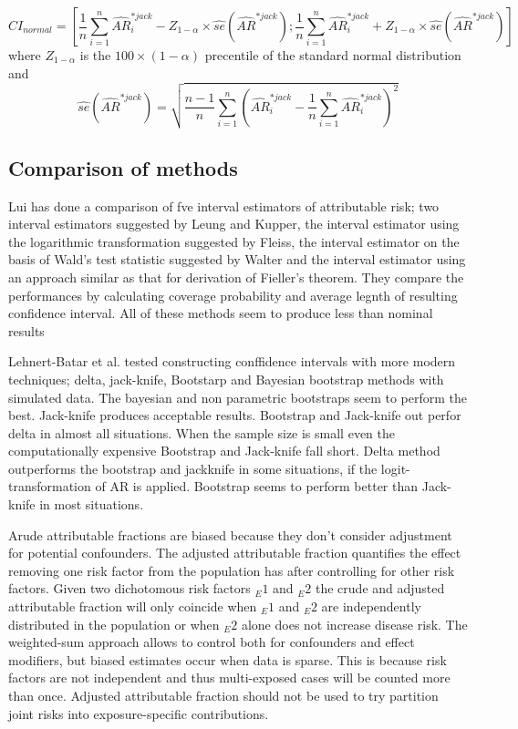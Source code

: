\begin{equation}
    CI_{normal} = [\frac{1}{n}\sum_{i=1}^{n}\hat{AR}_i^{*jack}-Z_{1-\alpha}\times\hat{se}(\hat{AR}^{*jack});\frac{1}{n}\sum_{i=1}^{n}\hat{AR}_i^{*jack}+Z_{1-\alpha}\times\hat{se}(\hat{AR}^{*jack})]
\end{equation} where $Z_{1-\alpha}$ is the $100\times(1-\alpha)$ precentile of the standard normal distribution and
\begin{equation}
    \hat{se}(\hat{AR}^{*jack})=\sqrt{\frac{n-1}{n}\sum_{i=1}^{n}(\hat{AR}_i^{*jack}-\frac{1}{n}\sum_{i=1}^{n}\hat{AR}_i^{*jack})^2}
\end{equation}
\cite{LehnertBatar2006ComparisonOC}

\subsection{Comparison of methods}
Lui has done a comparison of fve interval estimators of attributable risk; two interval estimators suggested by Leung and Kupper, the interval estimator using the logarithmic
transformation suggested by Fleiss, the interval estimator on the basis of Wald’s test
statistic suggested by Walter and the interval estimator using an approach similar as that
for derivation of Fieller’s theorem. They compare the performances by calculating coverage probability and average legnth of resulting confidence interval. All of these methods seem to produce less than nominal results\cite{Lui2001NotesOI}

Lehnert-Batar et al. tested constructing conffidence intervals with more modern techniques; delta, jack-knife, Bootstarp and Bayesian bootstrap methods with simulated data. The bayesian and non parametric bootstraps seem to perform the best. Jack-knife produces acceptable results. Bootstrap and Jack-knife out perfor delta in almost all situations. When the sample size is small even the computationally expensive Bootstrap and Jack-knife fall short. Delta method outperforms the bootstrap and jackknife in some situations, if the logit-transformation of AR is applied. Bootstrap seems to perform better than Jack-knife in most situations.\cite{LehnertBatar2006ComparisonOC}

Arude attributable fractions are biased because they don't consider adjustment for potential confounders. The adjusted attributable fraction quantifies the effect removing one risk factor from the population has after controlling for other risk factors. Given two dichotomous risk factors $_E1$ and $_E2$ the crude and adjusted attributable fraction will only coincide when $_E1$ and $_E2$ are independently distributed in the population or when $_E2$ alone does not increase disease risk. The weighted-sum approach allows to control both for confounders and effect modifiers, but biased estimates occur when data is sparse. This is because risk factors are not independent and thus multi-exposed cases will be counted more than once. Adjusted attributable fraction should not be used to try partition joint risks into exposure-specific contributions. \cite{DiMaso2020AttributableFF}

